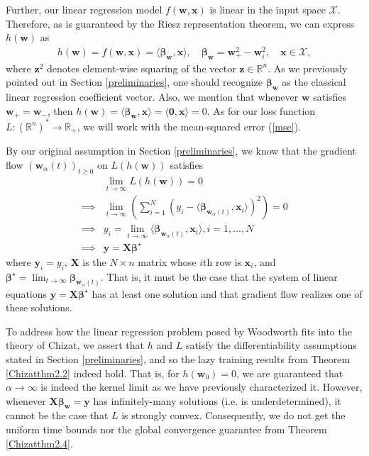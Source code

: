 \documentclass{article}
\begin{document}
Further, our linear regression model $f(\boldsymbol{w}, \boldsymbol{x})$ is linear in the input space $\mathcal{X}$. Therefore, as is guaranteed by the Riesz representation theorem, we can express $h(\boldsymbol{w})$ as 
\begin{align}
    h(\boldsymbol{w}) = f(\boldsymbol{w}, \boldsymbol{x}) = \langle \boldsymbol{\beta}_{\boldsymbol{w}}, \boldsymbol{x} \rangle, \quad \boldsymbol{\beta}_{\boldsymbol{w}} = \boldsymbol{w}_{+}^2 - \boldsymbol{w}_{i}^2, \quad \boldsymbol{x} \in \mathcal{X},
\end{align}
where $\boldsymbol{z}^2$ denotes element-wise squaring of the vector $\boldsymbol{z} \in \mathbb{R}^n$. As we previously pointed out in Section \ref{preliminaries}, one should recognize $\boldsymbol{\beta}_{\boldsymbol{w}}$ as the classical linear regression coefficient vector. Also, we mention that whenever $\boldsymbol{w}$ satisfies $\boldsymbol{w}_+ = \boldsymbol{w}_-$, then $h(\boldsymbol{w}) = \langle \boldsymbol{\beta}_{\boldsymbol{w}}, \boldsymbol{x} \rangle = \langle \boldsymbol{0}, \boldsymbol{x} \rangle = 0$. As for our loss function $L: (\mathbb{R}^n)^* \rightarrow \mathbb{R}_+$, we will work with the mean-squared error (\ref{mse}).


By our original assumption in Section \ref{preliminaries}, we know that the gradient flow $(\boldsymbol{w}_{\alpha}(t))_{t \geq 0}$ on $L(h(\boldsymbol{w}))$ satisfies
\begin{align*}
    &\lim_{t \to \infty} L(h(\boldsymbol{w})) = 0\\
    \implies&\lim_{t \to \infty} \left( \sum_{i=1}^N (y_i - \langle \boldsymbol{\beta}_{\boldsymbol{w}_{\alpha}(t)}, \boldsymbol{x}_i \rangle)^2 \right) = 0\\
    \implies& y_i =  \lim_{t \to \infty} \langle \boldsymbol{\beta}_{\boldsymbol{w}_{\alpha}(t)}, \boldsymbol{x}_i \rangle, i = 1, \ldots, N\\
    \implies&  \boldsymbol{y} = \boldsymbol{X}\boldsymbol{\beta}^{\star} 
\end{align*}
where $\boldsymbol{y}_i = y_i$, $\boldsymbol{X}$ is the $N \times n$ matrix whose $i$th row is $\boldsymbol{x}_i$, and $\boldsymbol{\beta}^{\star} = \lim_{t \to \infty} \boldsymbol{\beta}_{\boldsymbol{w}_{\alpha}(t)}$. That is, it must be the case that the system of linear equations $\boldsymbol{y} = \boldsymbol{X}\boldsymbol{\beta}^{\star}$ has at least one solution and that gradient flow realizes one of these solutions.

To address how the linear regression problem posed by Woodworth fits into the theory of Chizat, we assert that $h$ and $L$ satisfy the differentiability assumptions stated in Section \ref{preliminaries}, and so the lazy training results from Theorem \ref{Chizatthm2.2} indeed hold. That is, for $h(\boldsymbol{w}_0) = 0$, we are guaranteed that $\alpha \rightarrow \infty$ is indeed the kernel limit as we have previously characterized it. However, whenever $\boldsymbol{X} \boldsymbol{\beta}_{\boldsymbol{w}} = \boldsymbol{y}$ has infinitely-many solutions (i.e. is underdetermined), it cannot be the case that $L$ is strongly convex. Consequently, we do not get the uniform time bounds nor the global convergence guarantee from Theorem \ref{Chizatthm2.4}.
\end{document}
